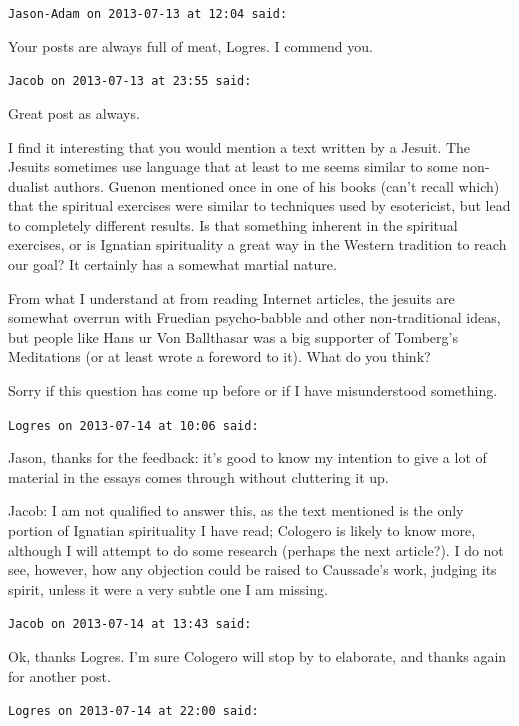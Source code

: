\begin{footnotesize}
\begin{sffamily}
\texttt{Jason-Adam on 2013-07-13 at 12:04 said:}

Your posts are always full of meat, Logres. I commend you.

\hfill

\texttt{Jacob on 2013-07-13 at 23:55 said:}

Great post as always.

I find it interesting that you would mention a text written by a Jesuit. The Jesuits sometimes use language that at least to me seems similar to some non-dualist authors. Guenon mentioned once in one of his books (can't recall which) that the spiritual exercises were similar to techniques used by esotericist, but lead to completely different results. Is that something inherent in the spiritual exercises, or is Ignatian spirituality a great way in the Western tradition to reach our goal? It certainly has a somewhat martial nature.

From what I understand at from reading Internet articles, the jesuits are somewhat overrun with Fruedian psycho-babble and other non-traditional ideas, but people like Hans ur Von Ballthasar was a big supporter of Tomberg's Meditations (or at least wrote a foreword to it). What do you think?

Sorry if this question has come up before or if I have misunderstood something.

\hfill

\texttt{Logres on 2013-07-14 at 10:06 said:}

Jason, thanks for the feedback: it's good to know my intention to give a lot of material in the essays comes through without cluttering it up.

Jacob: I am not qualified to answer this, as the text mentioned is the only portion of Ignatian spirituality I have read; Cologero is likely to know more, although I will attempt to do some research (perhaps the next article?). I do not see, however, how any objection could be raised to Caussade's work, judging its spirit, unless it were a very subtle one I am missing.

\hfill

\texttt{Jacob on 2013-07-14 at 13:43 said:}

Ok, thanks Logres. I'm sure Cologero will stop by to elaborate, and thanks again for another post.

\hfill

\texttt{Logres on 2013-07-14 at 22:00 said:}


\end{sffamily}
\end{footnotesize}
